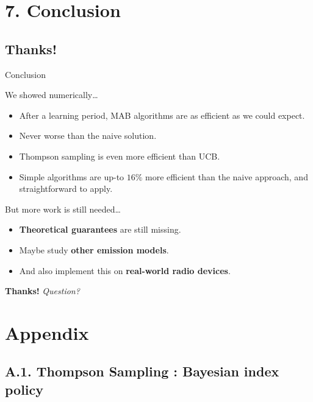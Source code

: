 \documentclass[12pt,english,ignorenonframetext,aspectratio=169,]{beamer}
\providecommand{\tightlist}{%
  \setlength{\itemsep}{0pt}\setlength{\parskip}{0pt}}
\begin{document}
\section{\hfill{}7. Conclusion\hfill{}}\subsection{\hfill{}Thanks!\hfill{}}

\begin{frame}{Conclusion}

\begin{block}{We showed numerically\ldots{}}

\begin{itemize}
\tightlist
\item
  After a learning period, MAB algorithms are as efficient as we could expect.
\item
  Never worse than the naive solution.
\item
  Thompson sampling is even more efficient than UCB.
\item
  Simple algorithms are up-to \(16\%\) more efficient than the naive
  approach, and straightforward to apply.
\end{itemize}

\end{block}

\begin{block}{But more work is still needed\ldots{}}

\begin{itemize}
\tightlist
\item
  \textbf{Theoretical guarantees} are still missing.
\item
  Maybe study \textbf{other emission models}.
\item
  And also implement this on \textbf{real-world radio devices}.
\end{itemize}

\end{block}

\hfill{} \textbf{Thanks!} \emph{Question?}

\end{frame}

\appendix
\backupbegin

\section{\hfill{}Appendix\hfill{}}

\subsection{\hfill{}A.1. Thompson Sampling : Bayesian index policy\hfill{}}
\end{document}
